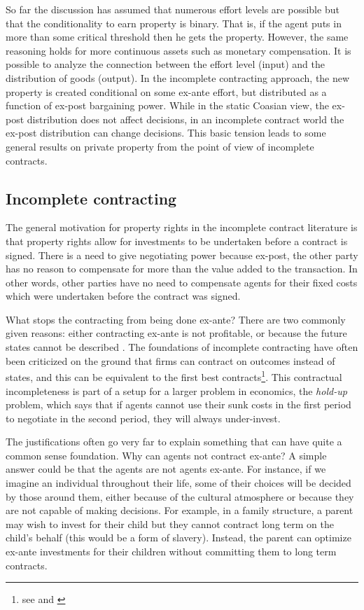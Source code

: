 So far the discussion has assumed that numerous effort levels are possible but that the conditionality to earn property is binary. That is, if the agent puts in more than some critical threshold then he gets the property. However, the same reasoning holds for more continuous assets such as monetary compensation. It is possible to analyze the connection between the effort level (input) and the distribution of goods (output). In the incomplete contracting approach, the new property is created conditional on some ex-ante effort, but distributed as a function of ex-post bargaining power. While in the static Coasian view, the ex-post distribution does not affect decisions, in an incomplete contract world the ex-post distribution can change decisions. This basic tension leads to some general results on private property from the point of view of incomplete contracts.

\subsection{Incomplete contracting} \label{incomplete}

The general motivation for property rights in the incomplete contract literature is that property rights allow for investments to be undertaken before a contract is signed. There is a need to give negotiating power because ex-post, the other party has no reason to compensate for more than the value added to the transaction. In other words, other parties have no need to compensate agents for their fixed costs which were undertaken before the contract was signed.

What stops the contracting from being done ex-ante? There are two commonly given reasons: either contracting ex-ante is not profitable, or because the future states cannot be described \citep{Hart1999}. The foundations of incomplete contracting have often been criticized on the ground that firms can contract on outcomes instead of states, and this can be equivalent to the first best contracts\footnote{see \cite{Maskin2002} and \cite{maskin1999unforeseen}}. This contractual incompleteness is part of a setup for a larger problem in economics, the \textit{hold-up} problem, which says that if agents cannot use their sunk costs in the first period to negotiate in the second period, they will always under-invest.

The justifications often go very far to explain something that can have quite a common sense foundation. Why can agents not contract ex-ante? A simple answer could be that the agents are not agents ex-ante. For instance, if we imagine an individual throughout their life, some of their choices will be decided by those around them, either because of the cultural atmosphere or because they are not capable of making decisions. For example, in a family structure, a parent may wish to invest for their child but they cannot contract long term on the child's behalf (this would be a form of slavery). Instead, the parent can optimize ex-ante investments for their children without committing them to long term contracts.

